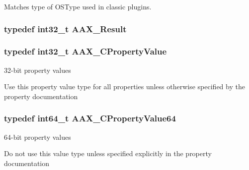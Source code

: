Matches type of O\+S\+Type used in classic plugins. 

\hypertarget{a00149_a4d8f69a697df7f70c3a8e9b8ee130d2f}{}
\subsubsection[{A\+A\+X\+\_\+\+Result}]{\setlength{\rightskip}{0pt plus 5cm}typedef int32\+\_\+t {\bf A\+A\+X\+\_\+\+Result}}\label{a00149_a4d8f69a697df7f70c3a8e9b8ee130d2f}
\hypertarget{a00149_ab247c0d8686c14e05cbb567ef276f249}{}
\subsubsection[{A\+A\+X\+\_\+\+C\+Property\+Value}]{\setlength{\rightskip}{0pt plus 5cm}typedef int32\+\_\+t {\bf A\+A\+X\+\_\+\+C\+Property\+Value}}\label{a00149_ab247c0d8686c14e05cbb567ef276f249}


32-\/bit property values 

Use this property value type for all properties unless otherwise specified by the property documentation \hypertarget{a00149_a49471789032304f99ac1af8c15a87313}{}
\subsubsection[{A\+A\+X\+\_\+\+C\+Property\+Value64}]{\setlength{\rightskip}{0pt plus 5cm}typedef int64\+\_\+t {\bf A\+A\+X\+\_\+\+C\+Property\+Value64}}\label{a00149_a49471789032304f99ac1af8c15a87313}


64-\/bit property values 

Do not use this value type unless specified explicitly in the property documentation \hypertarget{a00149_a7abe263a7521e988ed4ee4ac691ed5f9}{}
